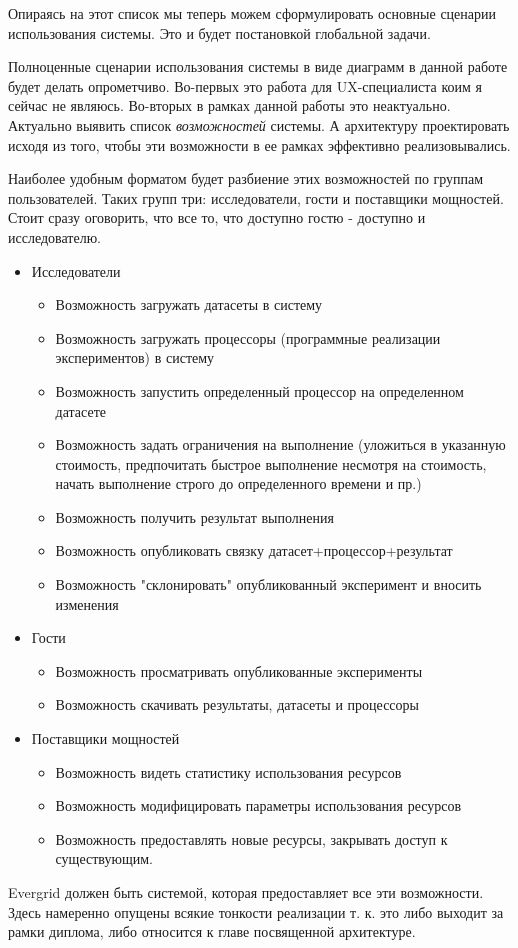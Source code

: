 Опираясь на этот список мы теперь можем сформулировать основные сценарии использования системы. Это и будет постановкой глобальной задачи.

Полноценные сценарии использования системы в виде диаграмм в данной работе будет делать опрометчиво. Во-первых это работа для UX-специалиста коим я сейчас не являюсь. Во-вторых в рамках данной работы это неактуально. Актуально выявить список \textit{возможностей} системы. А архитектуру проектировать исходя из того, чтобы эти возможности в ее рамках эффективно реализовывались.

Наиболее удобным форматом будет разбиение этих возможностей по группам пользователей. Таких групп три: исследователи, гости и поставщики мощностей. Стоит сразу оговорить, что все то, что доступно гостю - доступно и исследователю.

\begin{itemize}
	\item Исследователи
	\begin{itemize}
		\item Возможность загружать датасеты в систему
		\item Возможность загружать процессоры (программные реализации экспериментов) в систему
		\item Возможность запустить определенный процессор на определенном датасете
		\item Возможность задать ограничения на выполнение (уложиться в указанную стоимость, предпочитать быстрое выполнение несмотря на стоимость, начать выполнение строго до определенного времени и пр.)
		\item Возможность получить результат выполнения
		\item Возможность опубликовать связку датасет+процессор+результат
		\item Возможность "склонировать" опубликованный эксперимент и вносить изменения
	\end{itemize}
	\item Гости
	\begin{itemize}
		\item Возможность просматривать опубликованные эксперименты
		\item Возможность скачивать результаты, датасеты и процессоры
	\end{itemize}
	\item Поставщики мощностей
	\begin{itemize}
		\item Возможность видеть статистику использования ресурсов
		\item Возможность модифицировать параметры использования ресурсов
		\item Возможность предоставлять новые ресурсы, закрывать доступ к существующим.
	\end{itemize}
\end{itemize}

Evergrid должен быть системой, которая предоставляет все эти возможности. Здесь намеренно опущены всякие тонкости реализации т. к. это либо выходит за рамки диплома, либо относится к главе посвященной архитектуре.